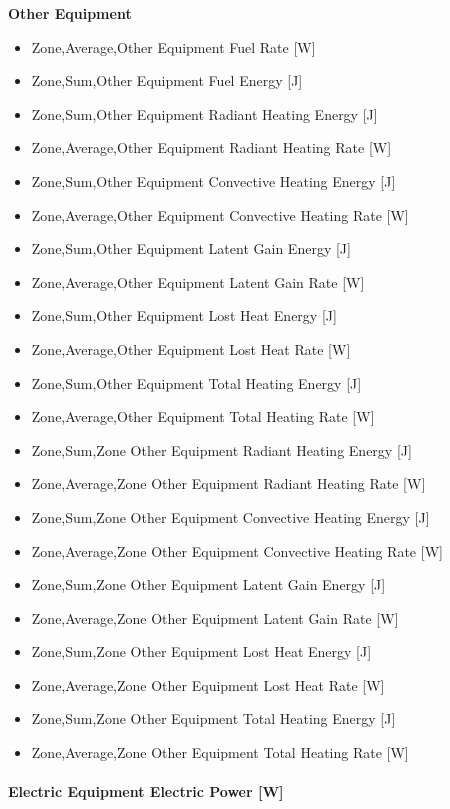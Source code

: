 \textbf{Other Equipment}

\begin{itemize}
\item
  Zone,Average,Other Equipment Fuel Rate {[}W{]}
\item
  Zone,Sum,Other Equipment Fuel Energy {[}J{]}
\item
  Zone,Sum,Other Equipment Radiant Heating Energy {[}J{]}
\item
  Zone,Average,Other Equipment Radiant Heating Rate {[}W{]}
\item
  Zone,Sum,Other Equipment Convective Heating Energy {[}J{]}
\item
  Zone,Average,Other Equipment Convective Heating Rate {[}W{]}
\item
  Zone,Sum,Other Equipment Latent Gain Energy {[}J{]}
\item
  Zone,Average,Other Equipment Latent Gain Rate {[}W{]}
\item
  Zone,Sum,Other Equipment Lost Heat Energy {[}J{]}
\item
  Zone,Average,Other Equipment Lost Heat Rate {[}W{]}
\item
  Zone,Sum,Other Equipment Total Heating Energy {[}J{]}
\item
  Zone,Average,Other Equipment Total Heating Rate {[}W{]}
\item
  Zone,Sum,Zone Other Equipment Radiant Heating Energy {[}J{]}
\item
  Zone,Average,Zone Other Equipment Radiant Heating Rate {[}W{]}
\item
  Zone,Sum,Zone Other Equipment Convective Heating Energy {[}J{]}
\item
  Zone,Average,Zone Other Equipment Convective Heating Rate {[}W{]}
\item
  Zone,Sum,Zone Other Equipment Latent Gain Energy {[}J{]}
\item
  Zone,Average,Zone Other Equipment Latent Gain Rate {[}W{]}
\item
  Zone,Sum,Zone Other Equipment Lost Heat Energy {[}J{]}
\item
  Zone,Average,Zone Other Equipment Lost Heat Rate {[}W{]}
\item
  Zone,Sum,Zone Other Equipment Total Heating Energy {[}J{]}
\item
  Zone,Average,Zone Other Equipment Total Heating Rate {[}W{]}
\end{itemize}

\paragraph{Electric Equipment Electric Power {[}W{]}}\label{electric-equipment-electric-power-w}

